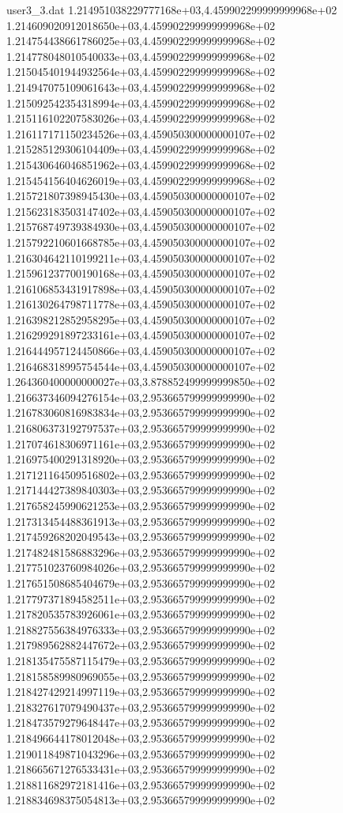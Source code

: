 \begin{filecontents}{user3_3.dat}
1.214951038229777168e+03,4.459902299999999968e+02
1.214609020912018650e+03,4.459902299999999968e+02
1.214754438661786025e+03,4.459902299999999968e+02
1.214778048010540033e+03,4.459902299999999968e+02
1.215045401944932564e+03,4.459902299999999968e+02
1.214947075109061643e+03,4.459902299999999968e+02
1.215092542354318994e+03,4.459902299999999968e+02
1.215116102207583026e+03,4.459902299999999968e+02
1.216117171150234526e+03,4.459050300000000107e+02
1.215285129306104409e+03,4.459902299999999968e+02
1.215430646046851962e+03,4.459902299999999968e+02
1.215454156404626019e+03,4.459902299999999968e+02
1.215721807398945430e+03,4.459050300000000107e+02
1.215623183503147402e+03,4.459050300000000107e+02
1.215768749739384930e+03,4.459050300000000107e+02
1.215792210601668785e+03,4.459050300000000107e+02
1.216304642110199211e+03,4.459050300000000107e+02
1.215961237700190168e+03,4.459050300000000107e+02
1.216106853431917898e+03,4.459050300000000107e+02
1.216130264798711778e+03,4.459050300000000107e+02
1.216398212852958295e+03,4.459050300000000107e+02
1.216299291897233161e+03,4.459050300000000107e+02
1.216444957124450866e+03,4.459050300000000107e+02
1.216468318995754544e+03,4.459050300000000107e+02
1.264360400000000027e+03,3.878852499999999850e+02
1.216637346094276154e+03,2.953665799999999990e+02
1.216783060816983834e+03,2.953665799999999990e+02
1.216806373192797537e+03,2.953665799999999990e+02
1.217074618306971161e+03,2.953665799999999990e+02
1.216975400291318920e+03,2.953665799999999990e+02
1.217121164509516802e+03,2.953665799999999990e+02
1.217144427389840303e+03,2.953665799999999990e+02
1.217658245990621253e+03,2.953665799999999990e+02
1.217313454488361913e+03,2.953665799999999990e+02
1.217459268202049543e+03,2.953665799999999990e+02
1.217482481586883296e+03,2.953665799999999990e+02
1.217751023760984026e+03,2.953665799999999990e+02
1.217651508685404679e+03,2.953665799999999990e+02
1.217797371894582511e+03,2.953665799999999990e+02
1.217820535783926061e+03,2.953665799999999990e+02
1.218827556384976333e+03,2.953665799999999990e+02
1.217989562882447672e+03,2.953665799999999990e+02
1.218135475587115479e+03,2.953665799999999990e+02
1.218158589980969055e+03,2.953665799999999990e+02
1.218427429214997119e+03,2.953665799999999990e+02
1.218327617079490437e+03,2.953665799999999990e+02
1.218473579279648447e+03,2.953665799999999990e+02
1.218496644178012048e+03,2.953665799999999990e+02
1.219011849871043296e+03,2.953665799999999990e+02
1.218665671276533431e+03,2.953665799999999990e+02
1.218811682972181416e+03,2.953665799999999990e+02
1.218834698375054813e+03,2.953665799999999990e+02

\end{filecontents}
